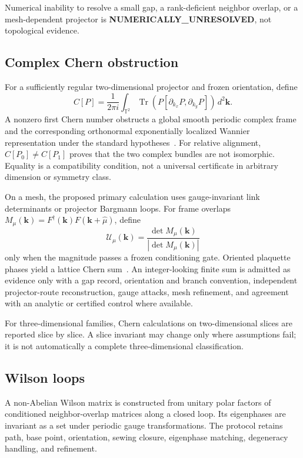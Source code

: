 \documentclass[11pt]{article}
\newenvironment{prospective}{\color{prospectivered}}{}
\begin{document}
\begin{prospective}
Numerical inability to resolve a small gap, a rank-deficient neighbor overlap, or a
mesh-dependent projector is \textbf{NUMERICALLY\_UNRESOLVED}, not topological evidence.

\subsection{Complex Chern obstruction}
For a sufficiently regular two-dimensional projector and frozen orientation, define
\begin{equation}
 C[P]=\frac{1}{2\pi i}\int_{\mathbb T^2}
 \operatorname{Tr}\!\left(P[\partial_{k_x}P,\partial_{k_y}P]\right)
 \,d^2\mathbf k.
\end{equation}
A nonzero first Chern number obstructs a global smooth periodic complex frame and the
corresponding orthonormal exponentially localized Wannier representation under the
standard hypotheses~\cite{brouder2007,panati2007}. For relative alignment,
$C[P_0]\ne C[P_1]$ proves that the two complex bundles are not isomorphic. Equality is a
compatibility condition, not a universal certificate in arbitrary dimension or symmetry
class.

On a mesh, the proposed primary calculation uses gauge-invariant link determinants or
projector Bargmann loops. For frame overlaps
$M_\mu(\mathbf k)=F^\dagger(\mathbf k)F(\mathbf k+\hat\mu)$, define
\begin{equation}
 \mathcal U_\mu(\mathbf k)
 =\frac{\det M_\mu(\mathbf k)}{|\det M_\mu(\mathbf k)|}
\end{equation}
only when the magnitude passes a frozen conditioning gate. Oriented plaquette phases
yield a lattice Chern sum~\cite{fukui2005}. An integer-looking finite sum is admitted as
evidence only with a gap record, orientation and branch convention, independent
projector-route reconstruction, gauge attacks, mesh refinement, and agreement with an
analytic or certified control where available.

For three-dimensional families, Chern calculations on two-dimensional slices are
reported slice by slice. A slice invariant may change only where assumptions fail; it is
not automatically a complete three-dimensional classification.

\subsection{Wilson loops}
A non-Abelian Wilson matrix is constructed from unitary polar factors of conditioned
neighbor-overlap matrices along a closed loop. Its eigenphases are invariant as a set
under periodic gauge transformations. The protocol retains path, base point,
orientation, sewing closure, eigenphase matching, degeneracy handling, and refinement.


\end{prospective}
\end{document}
